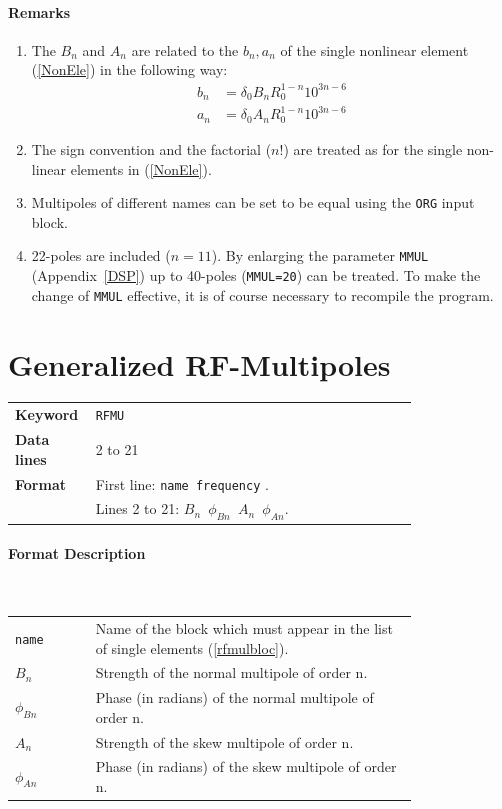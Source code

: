 \paragraph{Remarks}
\begin{enumerate}
    \item The $B_{n}$ and $A_{n}$ are related to the $b_{n}, a_{n}$ of the single nonlinear element (\ref{NonEle}) in the following way:
        \begin{align*}
            b_{n} &= \delta_{0} B_{n} R_{0}^{1-n} 10^{3n-6} \\
            a_{n} &= \delta_{0} A_{n} R_{0}^{1-n} 10^{3n-6}
        \end{align*}
    \item The sign convention and the factorial ($n$!) are treated as for the single non-linear elements in (\ref{NonEle}).
    \item Multipoles of different names can be set to be equal using the \texttt{ORG} input block.
    \item 22-poles are included ($n=11$). By enlarging the parameter \texttt{MMUL} (Appendix~\ref{DSP}) up to 40-poles (\texttt{MMUL=20}) can be treated. To make the change of \texttt{MMUL} effective, it is of course necessary to recompile the program.
\end{enumerate}

\section{Generalized RF-Multipoles} \label{generalrf}

\bigskip
\begin{tabular}{@{}lp{0.8\linewidth}}
    \textbf{Keyword}    & \texttt{RFMU}\index{RFMU} \\
    \textbf{Data lines} & 2 to 21 \\
    \textbf{Format}     & First line: \texttt{name frequency}  . \\
                        & Lines 2 to 21: \texttt{$B_{n}$ $\phi_{Bn}$ $A_{n}$ $\phi_{An}$}.
\end{tabular}

\paragraph{Format Description}~

\bigskip
\begin{tabular}{@{}lp{0.8\linewidth}}
    \texttt{name}    & Name of the block which must appear in the list of single elements\index{single elements} (\ref{rfmulbloc}). \\
    \texttt{$B_{n}$} & Strength of the normal multipole of order n.  \\
    \texttt{$\phi_{Bn}$} & Phase (in radians) of the normal multipole of order n.  \\
    \texttt{$A_{n}$} & Strength of the skew multipole of order n.  \\
    \texttt{$\phi_{An}$} & Phase (in radians) of the skew multipole of order n.  \\
\end{tabular}

